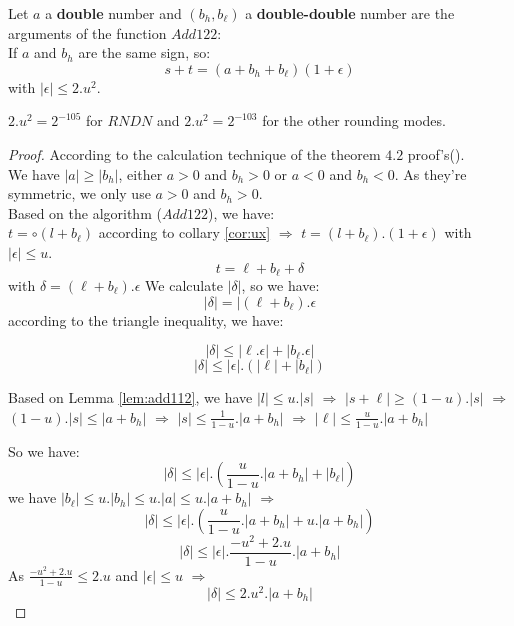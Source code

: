 \begin{theo} \label{the1:add122}
Let $a$ a \textbf{double} number and $(b_h,b_{\ell})$ a \textbf{double-double} number are the arguments of the function $Add122$:\\
If $a$ and $b_h$ are the same sign, so:\\
$$s+t = (a+b_h+b_{\ell})(1+\epsilon)$$ with $\lvert \epsilon \rvert \le 2.u^2$.
\end{theo}
$2.u^2= 2^{-105}$ for $RNDN$ and $2.u^2 = 2^{-103}$ for the other rounding modes.

\begin{proof} \color{-yellow}
According to the calculation technique of the theorem $4.2$ proof's(\cite{lauter2005basic}).\\
We have $\lvert a \rvert \ge \lvert b_h \rvert$, either $a > 0$ and $b_h > 0$ or $a < 0$ and $b_h < 0$. As they're symmetric, we only use $a > 0$ and $b_h > 0$.\\
Based on the algorithm ($Add122$), we have:\\
$t = \circ (l +b_{\ell})$ according to collary \ref{cor:ux} 
$\Rightarrow$ $t = (l+b_{\ell}).(1+\epsilon)$ with $\lvert \epsilon \rvert \le u$.\\

$$t = \ell + b_{\ell} + \delta$$
with  $\delta = (\ell   + b_{\ell}) .\epsilon$
We calculate $\lvert \delta \rvert$, so we have:\\
$$ \lvert \delta \rvert = \lvert (\ell + b_{\ell}).\epsilon$$
according to the triangle inequality, we have:

$$ \lvert \delta \rvert \le \lvert \ell  .\epsilon \rvert + \lvert  b_{\ell}.\epsilon \rvert$$
$$\lvert \delta \rvert \le \lvert \epsilon \rvert .(\lvert \ell   \rvert + \lvert  b_{\ell}\rvert)$$ 
 

Based on Lemma \ref{lem:add112}, we have $\lvert l \rvert \le u.\lvert s \rvert $ 
$\Rightarrow$ $\lvert s+\ell \rvert \ge (1-u).\lvert s \rvert$ $\Rightarrow$
$(1-u).\lvert s \rvert \le \lvert a + b_h \rvert$ $\Rightarrow$ $\lvert s \rvert \le \frac{1}{1-u}.\lvert a + b_h \rvert$ $\Rightarrow$ $\lvert \ell \rvert \le \frac{u}{1-u}.\lvert a + b_h \rvert$

So we have:
$$\lvert \delta \rvert \le  \lvert \epsilon \rvert .( \frac{u}{1-u}.\lvert a + b_h \rvert + \lvert  b_{\ell}\rvert)$$ 
we have  $\lvert b_{\ell}  \rvert \le u. \lvert b_h \rvert \le u. \lvert a \rvert \le u. \lvert a  + b_h\rvert$ $\Rightarrow$
$$\lvert \delta \rvert \le \lvert \epsilon \rvert .(\frac{u}{1-u}. \lvert a + b_h \rvert + u. \lvert a + b_h \rvert)$$ 
$$\lvert \delta \rvert \le \lvert \epsilon \rvert .\frac{-u^2+2.u}{1-u}. \lvert a + b_h \rvert $$
As $\frac{-u^2+2.u}{1-u} \le 2.u$ and $\lvert \epsilon \rvert \le u$
$\Rightarrow$
$$\lvert \delta \rvert \le 2.u^2. \lvert a + b_h \rvert $$



\end{proof}
